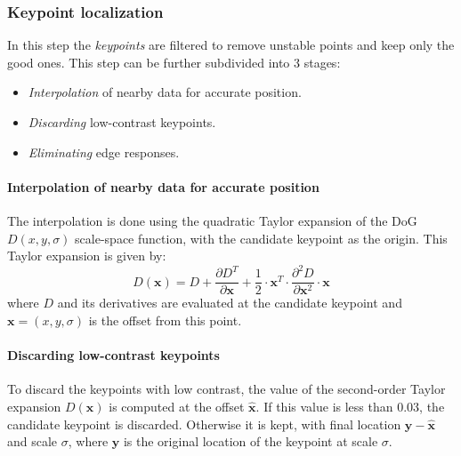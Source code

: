\subsubsection{Keypoint localization}
In this step the \emph{keypoints} are filtered to remove unstable points and
keep only the good ones. This step can be further subdivided into 3 stages:
\begin{itemize}
    \item \emph{Interpolation} of nearby data for accurate position.
    \item \emph{Discarding} low-contrast keypoints.
    \item \emph{Eliminating} edge responses.
\end{itemize}

\paragraph{Interpolation of nearby data for accurate position} The interpolation
is done using the quadratic Taylor expansion of the \ac{DoG} $D(x,y,\sigma)$
scale-space function, with the candidate keypoint as the origin.
This Taylor expansion is given by:
\[
    D(\mathbf{x}) = D + \frac{\partial{}D^T}{\partial{}\mathbf{x}} +
    \frac{1}{2}\cdot{}\mathbf{x}^T\cdot\frac{\partial^2D}{\partial{}
    \mathbf{x}^2}\cdot{}\mathbf{x}
\]
where $D$ and its derivatives are evaluated at the candidate keypoint and
$\mathbf{x}=(x,y,\sigma)$ is the offset from this point.

\paragraph{Discarding low-contrast keypoints}
To discard the keypoints with low contrast, the value of the second-order Taylor
expansion $D(\mathbf{x})$ is computed at the offset $\hat{\mathbf{x}}$. If this
value is less than $0.03$, the candidate keypoint is discarded. Otherwise it is
kept, with final location $\mathbf{y}-\hat{\mathbf{x}}$ and scale $\sigma$,
where $\mathbf{y}$ is the original location of the keypoint at scale $\sigma$.

